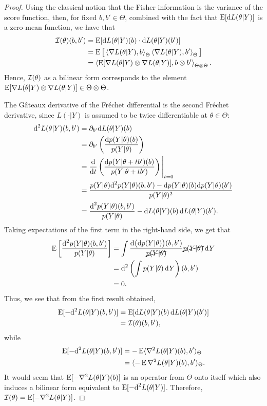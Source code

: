 \begin{proof}
Using the classical notion that the Fisher information is the variance of the score function, then, for fixed $b,b'\in\Theta$, combined with the fact that $\operatorname{E}[\text{d} L(\theta|Y)]$ is a zero-mean function, we have that 
\begin{align*}
  {\mathcal I}(\theta)(b,b') 
  &= \operatorname{E} [ \text{d} L(\theta|Y)(b) \cdot \text{d} L(\theta|Y)(b') ] \\
  &= \operatorname{E} \big[ \left\langle \nabla L(\theta|Y) , b \right\rangle_\Theta \left\langle \nabla L(\theta|Y) , b' \right\rangle_\Theta \big] \\
  &= \left\langle \operatorname{E} [\nabla L(\theta|Y) \otimes \nabla L(\theta|Y)] , b \otimes b' \right\rangle_{\Theta\otimes\Theta}.
\end{align*}
Hence, ${\mathcal I}(\theta)$ as a bilinear form corresponds to the element $\operatorname{E} [\nabla L(\theta|Y) \otimes \nabla L(\theta|Y)] \in \Theta\otimes\Theta$.

The Gâteaux derivative of the Fréchet differential is the second Fréchet derivative, since $L(\cdot|Y)$ is assumed to be twice differentiable at $\theta\in\Theta$:
\begin{align*}
  \text{d}^2 L(\theta|Y)(b,b') 
  &= \partial_{b'} \text{d} L(\theta|Y)(b) \\
  &= \partial_{b'} \left( \frac{\text{d} p(Y|\theta)(b)}{p(Y|\theta)} \right) \\
  &= \frac{\text{d}}{\text{d} t} \left( \frac{\text{d} p(Y|\theta + tb')(b)}{p(Y|\theta + tb')} \right) \Bigg|_{t=0} \\
  &= \frac{p(Y|\theta)\text{d}^2 p(Y|\theta)(b,b') - \text{d} p(Y|\theta)(b)\text{d} p(Y|\theta)(b') }{p(Y|\theta)^2} \\
  &= \frac{\text{d}^2 p(Y|\theta)(b,b')  }{p(Y|\theta)} 
  - \text{d} L(\theta|Y)(b) \, \text{d} L(\theta|Y)(b').
\end{align*}
Taking expectations of the first term in the right-hand side, we get that
\begin{align*}
  \operatorname{E}\left[ \frac{\text{d}^2 p(Y|\theta)(b,b')}{p(Y|\theta)} \right] 
  &= \int \frac{\text{d} \big( \text{d} p(Y|\theta) \big)(b,b')}{\cancel{p(Y|\theta)}} \cancel{p(Y|\theta)} \operatorname{d}\hspace{0.5pt}\! Y   \\
  &= \text{d}^2 \left( \int p(Y|\theta) \operatorname{d}\hspace{0.5pt}\! Y \right)(b,b') \\
  &= 0.
\end{align*}
Thus, we see that from the first result obtained, 
\begin{align*}
  \operatorname{E} [-\text{d}^2 L(\theta|Y)(b,b') ]
  &= \operatorname{E}[\text{d} L(\theta|Y)(b) \, \text{d} L(\theta|Y)(b')] \\
  &= {\mathcal I}(\theta)(b,b'),
\end{align*}
while
\begin{align*}
  \operatorname{E} [-\text{d}^2 L(\theta|Y)(b,b') ]
  &= -\operatorname{E}\langle\nabla^2 L(\theta|Y)(b), b'\rangle_\Theta \\
  &= \langle-\operatorname{E} \nabla^2 L(\theta|Y)(b), b'\rangle_\Theta.
\end{align*}
It would seem that $\operatorname{E}[- \nabla^2 L(\theta|Y)(b)]$ is an operator from $\Theta$ onto itself which also induces a bilinear form equivalent to $\operatorname{E} [-\text{d}^2 L(\theta|Y)]$.
Therefore, ${\mathcal I}(\theta) = \operatorname{E}[- \nabla^2 L(\theta|Y)]$.
\end{proof}

